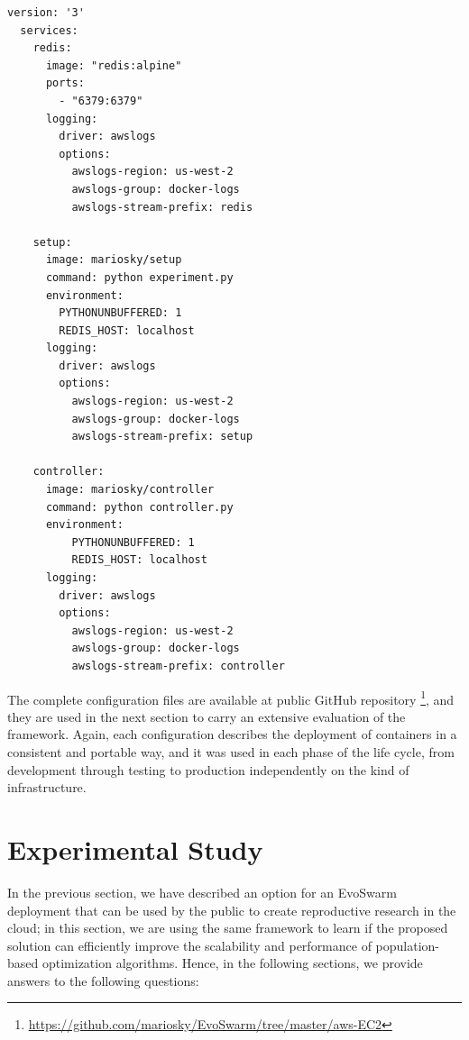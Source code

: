 \documentclass[review]{elsarticle}
\begin{document}
\begin{lstlisting}[caption={docker-compose.yml for setup, controller and redis containers}, label=code:compose]
  version: '3'
  services:
    redis:
      image: "redis:alpine"
      ports:
        - "6379:6379"
      logging:
        driver: awslogs
        options:
          awslogs-region: us-west-2
          awslogs-group: docker-logs
          awslogs-stream-prefix: redis
  
    setup:
      image: mariosky/setup
      command: python experiment.py
      environment:
        PYTHONUNBUFFERED: 1
        REDIS_HOST: localhost
      logging:
        driver: awslogs
        options:
          awslogs-region: us-west-2
          awslogs-group: docker-logs
          awslogs-stream-prefix: setup
        
    controller:
      image: mariosky/controller
      command: python controller.py
      environment:
          PYTHONUNBUFFERED: 1
          REDIS_HOST: localhost
      logging:
        driver: awslogs
        options:
          awslogs-region: us-west-2
          awslogs-group: docker-logs
          awslogs-stream-prefix: controller
  \end{lstlisting}




%


The complete configuration files are available at public GitHub repository 
\footnote{\url{https://github.com/mariosky/EvoSwarm/tree/master/aws-EC2}}, and
they are used in the next section to carry an extensive evaluation of the framework.
Again, each configuration describes the deployment of containers in a consistent
and portable way, and it was used in each phase of the life cycle, from
development through testing to production independently on the kind of
infrastructure.


\section{Experimental Study} 
\label{setup} %


In the previous section, we have described an option for an EvoSwarm
deployment that can be used by the public to create reproductive
research in the cloud; in this section, we are using the same
framework to learn if the proposed solution can efficiently improve
the scalability and performance of population-based optimization
algorithms.  Hence, in the following sections, we provide answers to
the following questions:
\end{document}
